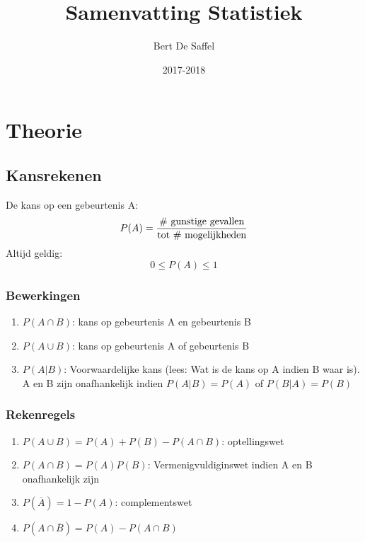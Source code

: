 \documentclass[12pt]{report}
\title{Samenvatting Statistiek}
\author{Bert De Saffel}
\date{2017-2018}
\begin{document}
\maketitle
\tableofcontents

\part{Theorie}
\chapter{Kansrekenen}
De kans op een gebeurtenis A:
$$P(A) = \frac{\hbox{\# gunstige gevallen}}{\hbox{tot \# mogelijkheden}}$$
Altijd geldig: 
$$0 \leq P(A) \leq 1$$
\section{Bewerkingen}
\begin{enumerate}
 \item $P(A \cap B)$: kans op gebeurtenis A en gebeurtenis B
 \item $P(A \cup B)$: kans op gebeurtenis A of gebeurtenis B
 \item $P(A|B)$: Voorwaardelijke kans (lees: Wat is de kans op A indien B waar is). A en B zijn onafhankelijk indien $P(A|B) = P(A)$ of $P(B|A) = P(B)$
\end{enumerate}
\section{Rekenregels}
\begin{enumerate}
 \item $P(A \cup B) = P(A) + P(B) - P(A \cap B)$: optellingswet
 \item $P(A \cap B) = P(A)P(B)$: Vermenigvuldiginswet indien A en B onafhankelijk zijn
 \item $P(\overline{A}) = 1 - P(A)$: complementswet
 \item $P(A \cap \overline{B}) = P(A) - P(A \cap B)$
\end{enumerate}
\end{document}
